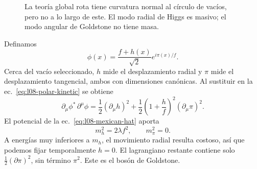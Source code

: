 \begin{figure}[htbp]
\centering
{}
\caption{La teoría global rota tiene curvatura normal al círculo de vacíos, pero no a lo largo de este. El modo radial de Higgs es masivo; el modo angular de Goldstone no tiene masa.}
\label{fig:l08-radial-angular}
\end{figure}

Definamos
\begin{equation}
  \phi(x)=\frac{f+h(x)}{\sqrt2}
           e^{i\pi(x)/f}.
  \label{eq:l08-canonical-polar}
\end{equation}
Cerca del vacío seleccionado, \(h\) mide el desplazamiento radial y \(\pi\) mide el desplazamiento tangencial, ambos con dimensiones canónicas. Al sustituir en la ec.~\eqref{eq:l08-polar-kinetic} se obtiene
\begin{equation}
  \partial_\mu\phi^*\,\partial^\mu\phi
  =
  \frac12(\partial_\mu h)^2
  +\frac12\left(1+\frac{h}{f}\right)^2
            (\partial_\mu\pi)^2.
  \label{eq:l08-global-expanded}
\end{equation}
El potencial de la ec.~\eqref{eq:l08-mexican-hat} aporta
\begin{equation}
  m_h^2=2\lambda f^2,
  \qquad
  m_\pi^2=0.
  \label{eq:l08-global-masses}
\end{equation}
A energías muy inferiores a \(m_h\), el movimiento radial resulta costoso, así que podemos fijar temporalmente \(h=0\). El lagrangiano restante contiene solo \(\frac12(\partial\pi)^2\), sin término \(\pi^2\). Este es el bosón de Goldstone.

